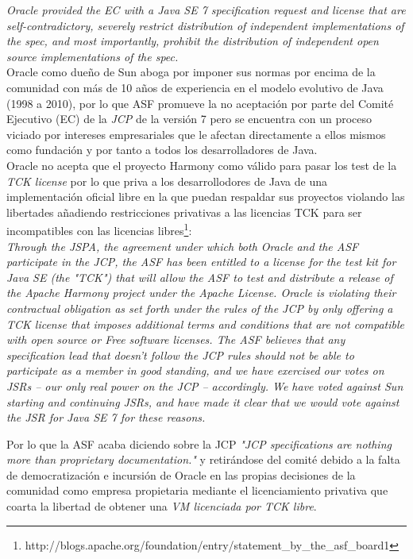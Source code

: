 \documentclass[11pt]{scrartcl}
\begin{document}
    \emph{Oracle provided the EC with a Java SE 7 specification request and license that are self-contradictory, severely restrict distribution of independent implementations of the spec, and most importantly, prohibit the distribution of independent open source implementations of the spec.}\\
    
Oracle como dueño de Sun aboga por imponer sus normas por encima de la comunidad con más de 10 años de experiencia en el modelo evolutivo de Java (1998 a 2010), por lo que ASF promueve la no aceptación por parte del Comité Ejecutivo (EC) de la \emph{JCP} de la versión 7 pero se encuentra con un proceso viciado por intereses empresariales que le afectan directamente a ellos mismos como fundación y por tanto a todos los desarrolladores de Java.\\

Oracle no acepta que el proyecto Harmony como válido para pasar los test de la \emph{TCK license} por lo que priva a los desarrollodores de Java de una implementación oficial libre en la que puedan respaldar sus proyectos violando las libertades añadiendo restricciones privativas a las licencias TCK para ser incompatibles con las licencias libres\footnote{http://blogs.apache.org/foundation/entry/statement\_by\_the\_asf\_board1}:\\

    \emph{Through the JSPA, the agreement under which both Oracle and the ASF participate in the JCP, the ASF has been entitled to a license for the test kit for Java SE (the "TCK") that will allow the ASF to test and distribute a release of the Apache Harmony project under the Apache License. Oracle is violating their contractual obligation as set forth under the rules of the JCP by only offering a TCK license that imposes additional terms and conditions that are not compatible with open source or Free software licenses. The ASF believes that any specification lead that doesn't follow the JCP rules should not be able to participate as a member in good standing, and we have exercised our votes on JSRs -- our only real power on the JCP -- accordingly.  We have voted against Sun starting and continuing JSRs, and have made it clear that we would vote against the JSR for Java SE 7 for these reasons.}

Por lo que la ASF acaba diciendo sobre la JCP \emph{"JCP specifications are nothing more than proprietary documentation."} y retirándose del comité debido a la falta de democratización e incursión de Oracle en las propias decisiones de la comunidad como empresa propietaria mediante el licenciamiento privativa que coarta la libertad de obtener una \emph{VM licenciada por TCK libre}.
\end{document}
